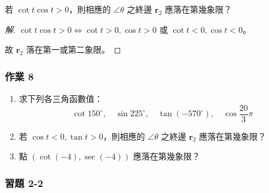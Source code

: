 \begin{example}
若 $\cot t \cos t > 0$，則相應的 $\angle\theta$ 之終邊 $\mathbf{r}_2$ 應落在第幾象限？
\end{example}

\begin{proof}[解]
$\cot t \cos t > 0 \iff \cot t > 0, \cos t > 0$ 或 $\cot t < 0, \cos t < 0$。

故 $\mathbf{r}_2$ 落在第一或第二象限。\qedhere
\end{proof}

\subsubsection*{作業 8}
\begin{enumerate}[label=\roman*), leftmargin=2.5em]
  \item 求下列各三角函數值：
  \[ \cot 150^\circ,\quad \sin 225^\circ,\quad \tan(-570^\circ),\quad \cos\frac{20}{3}\pi \]
  \item 若 $\cos t < 0, \tan t > 0$，則相應的 $\angle\theta$ 之終邊 $\mathbf{r}_2$ 應落在第幾象限？
  \item 點 $(\cot(-4), \sec(-4))$ 應落在第幾象限？
\end{enumerate}

\subsubsection*{習題 2-2}

